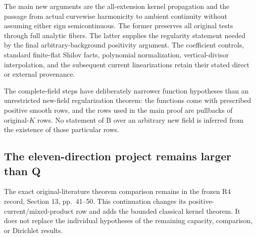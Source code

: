 \documentclass[11pt,a4paper]{article}
\numberwithin{equation}{section}
\theoremstyle{definition}
\theoremstyle{remark}
\begin{document}
The main new arguments are the all-extension kernel propagation
and the passage from actual curvewise harmonicity to ambient
continuity without assuming either sign semicontinuous. The
former preserves all original tests through full analytic fibers.
The latter supplies the regularity statement needed by the final
arbitrary-background positivity argument. The coefficient controls,
standard finite-flat Shilov facts, polynomial normalization,
vertical-divisor interpolation, and the subsequent current
linearizations retain their stated direct or external provenance.

The complete-field steps have deliberately narrower function
hypotheses than an unrestricted new-field regularization theorem:
the functions come with prescribed positive smooth rows, and the
rows used in the main proof are pullbacks of original-$K$ rows.
No statement of B over an arbitrary new field is inferred from
the existence of those particular rows.

\subsection{The eleven-direction project remains larger than Q}

The exact original-literature theorem comparison remains in the
frozen R4 record, Section 13, pp.~41--50. This continuation changes its
positive-current/mixed-product row and adds the bounded classical
kernel theorem. It does not replace the individual hypotheses
of the remaining capacity, comparison, or Dirichlet results.
\end{document}
